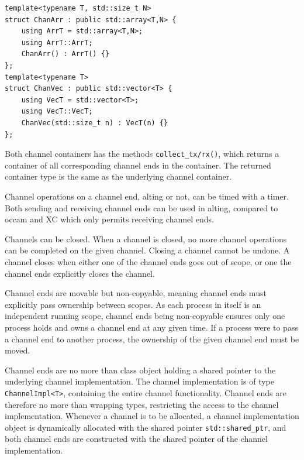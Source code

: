 \begin{lstfloat}
\begin{lstlisting}[caption={Channel container types.}, label={lst:channel_container_types}, style={CustomC++}, xleftmargin={2em}]
template<typename T, std::size_t N>
struct ChanArr : public std::array<T,N> {
    using ArrT = std::array<T,N>;
    using ArrT::ArrT;
    ChanArr() : ArrT() {}
};
template<typename T>
struct ChanVec : public std::vector<T> {
    using VecT = std::vector<T>;
    using VecT::VecT;
    ChanVec(std::size_t n) : VecT(n) {}
};
\end{lstlisting}
\end{lstfloat}

Both channel containers has the methods \lstinline[style={CustomC++}]|collect_tx/rx()|, which returns a container of all corresponding channel ends in the container. The returned container type is the same as the underlying channel container.

Channel operations on a channel end, alting or not, can be timed with a timer. Both sending and receiving channel ends can be used in alting, compared to occam and XC which only permits receiving channel ends.

Channels can be closed. When a channel is closed, no more channel operations can be completed on the given channel. Closing a channel cannot be undone. A channel closes when either one of the channel ends goes out of scope, or one the channel ends explicitly closes the channel.

Channel ends are movable but non\hyp{}copyable, meaning channel ends must explicitly pass ownership between scopes. As each process in itself is an independent running scope, channel ends being non\hyp{}copyable ensures only one process holds and owns a channel end at any given time. If a process were to pass a channel end to another process, the ownership of the given channel end must be moved.

Channel ends are no more than class object holding a shared pointer to the underlying channel implementation. The channel implementation is of type \lstinline[style={CustomC++}]|ChannelImpl<T>|, containing the entire channel functionality. Channel ends are therefore no more than wrapping types, restricting the access to the channel implementation. Whenever a channel is to be allocated, a channel implementation object is dynamically allocated with the shared pointer \lstinline[style={CustomC++}]|std::shared_ptr|, and both channel ends are constructed with the shared pointer of the channel implementation.

